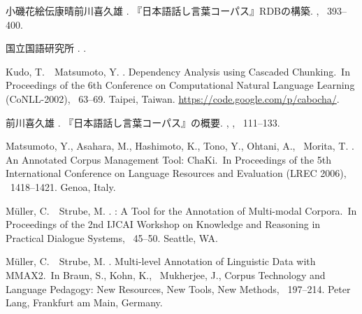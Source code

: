\documentclass[japanese]{jnlp_1.4}
\begin{document}
\begin{thebibliography}{}
小磯花絵\JBA 伝康晴\JBA 前川喜久雄 \BBCP.
\newblock 『日本語話し言葉コーパス』RDBの構築.
\newblock {}, \mbox{\BPGS\ 393--400}.

国立国語研究所 \BBCP.
\newblock {}.

Kudo, T.\BBACOMMA\ \BBA\ Matsumoto, Y. \BBCP.
\newblock {} Dependency Analysis using Cascaded Chunking.\BBCQ\
\newblock In {\Bem Proceedings of the 6th Conference on Computational Natural
  Language Learning ({CoNLL-2002})}, \mbox{\BPGS\ 63--69}. Taipei, Taiwan.
\newblock \url{https://code.google.com/p/cabocha/}.

前川喜久雄 \BBCP.
\newblock 『日本語話し言葉コーパス』の概要.
\newblock {}, {}, \mbox{\BPGS\ 111--133}.

Matsumoto, Y., Asahara, M., Hashimoto, K., Tono, Y., Ohtani, A., \BBA\ Morita,
  T. \BBOP 2006\BBCP.
\newblock \BBOQ An Annotated Corpus Management Tool: {ChaKi}.\BBCQ\
\newblock In {\Bem Proceedings of the 5th International Conference on Language
  Resources and Evaluation ({LREC} 2006)}, \mbox{\BPGS\ 1418--1421}. Genoa,
  Italy.

M\"uller, C.\BBACOMMA\ \BBA\ Strube, M. \BBOP 2001\BBCP.
\newblock {}: A Tool for the Annotation of Multi-modal Corpora.\BBCQ\
\newblock In {\Bem Proceedings of the 2nd IJCAI Workshop on Knowledge and
  Reasoning in Practical Dialogue Systems}, \mbox{\BPGS\ 45--50}. Seattle, WA.

M\"uller, C.\BBACOMMA\ \BBA\ Strube, M. \BBOP 2006\BBCP.
\newblock \BBOQ Multi-level Annotation of Linguistic Data with {MMAX2}.\BBCQ\
\newblock In Braun, S., Kohn, K., \BBA\ Mukherjee, J.\BEDS, {\Bem Corpus
  Technology and Language Pedagogy: New Resources, New Tools, New Methods},
  \mbox{\BPGS\ 197--214}. Peter Lang, Frankfurt am Main, Germany.


\end{thebibliography}
\end{document}
